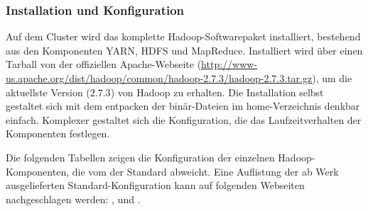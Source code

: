 \subsubsection{Installation und Konfiguration}
Auf dem Cluster wird das komplette Hadoop-Softwarepaket installiert, bestehend aus den
Komponenten \ac{YARN}, \ac{HDFS} und MapReduce. Installiert wird über einen Tarball von der offiziellen
Apache-Webseite (\url{http://www-us.apache.org/dist/hadoop/common/hadoop-2.7.3/hadoop-2.7.3.tar.gz}), um die aktuellste Version ($2.7.3$) von Hadoop zu erhalten. Die Installation selbst gestaltet sich mit dem entpacken der binär-Dateien im home-Verzeichnis 
denkbar einfach. Komplexer gestaltet sich die Konfiguration, die das Laufzeitverhalten der Komponenten festlegen.

Die folgenden Tabellen zeigen die Konfiguration der einzelnen Hadoop-Komponenten, die vom der Standard abweicht.
Eine Auflistung der ab Werk ausgelieferten Standard-Konfiguration kann auf folgenden Webseiten nachgeschlagen werden:
\cite{hdfsDefault}, \cite{yarnDefault} und \cite{mapreduceDefault}.

